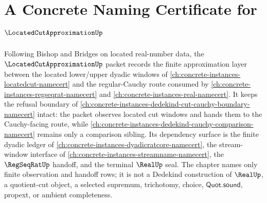 \chapter{A Concrete Naming Certificate for $\LocatedCutApproximationUp$}
\label{ch:concrete-instances-located-cut-approximation-namecert}

Following Bishop and Bridges on located real-number data, the $\LocatedCutApproximationUp$ packet records the finite approximation layer between the located lower/upper dyadic windows of \autoref{ch:concrete-instances-locatedcut-namecert} and the regular-Cauchy route consumed by \autoref{ch:concrete-instances-regseqrat-namecert} and \autoref{ch:concrete-instances-real-namecert}. It keeps the refusal boundary of \autoref{ch:concrete-instances-dedekind-cut-cauchy-boundary-namecert} intact: the packet observes located cut windows and hands them to the Cauchy-facing route, while \autoref{ch:concrete-instances-dedekind-cauchy-comparison-namecert} remains only a comparison sibling. Its dependency surface is the finite dyadic ledger of \autoref{ch:concrete-instances-dyadicratcore-namecert}, the stream-window interface of \autoref{ch:concrete-instances-streamname-namecert}, the $\RegSeqRatUp$ handoff, and the terminal $\RealUp$ seal. The chapter names only finite observation and handoff rows; it is not a Dedekind construction of $\RealUp$, a quotient-cut object, a selected supremum, trichotomy, choice, $\mathsf{Quot.sound}$, propext, or ambient completeness.


